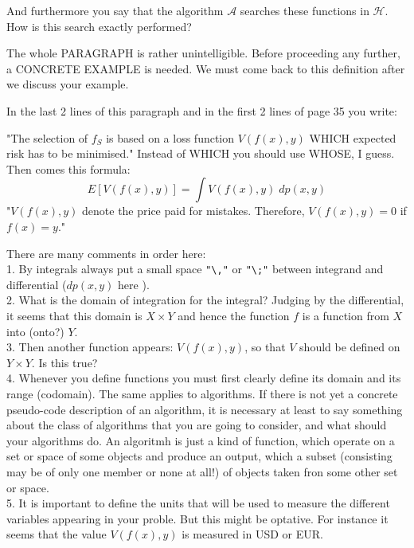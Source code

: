 \documentclass[12pt,reqno]{amsart}
\def\blue#1{{\color{blue} #1}}
\def\red#1{{\color{red} #1}}
\begin{document}
\begin{description}[style=unboxed,leftmargin=0cm,itemsep=3ex]
And furthermore you say that the algorithm $\mathcal{A}$ \red{searches}
these functions in $\mathcal{H}$.
How is this search exactly performed?

The whole PARAGRAPH is rather unintelligible.
Before proceeding any further, a CONCRETE EXAMPLE is needed. 
We must come back to this definition after we discuss your example.

In the last 2 lines of this paragraph and in the first 2 lines of page
35 you write:

"The selection of $f_S$ is based on a loss function $V(f(x),y)$
\red{WHICH} expected risk has to be minimised."
Instead of \red{WHICH} you should use \blue{WHOSE}, I guess.
Then comes this formula:
$$
E[V(f(x),y)] = \int V(f(x),y)\;dp(x,y)
$$
"$V(f(x),y)$ denote the price paid for mistakes. Therefore,
$V(f(x),y) = 0$ if $f(x) = y$."

There are many comments in order here:\\[1ex]

1. By integrals always put a small space \verb!"\,"! or \verb!"\;"!
between integrand and differential ($dp(x,y)$ here ).\\[1ex]

2. What is the domain of integration for the integral?
Judging by the differential, it seems that this domain is $X\times Y$
and hence the function $f$ is a function from $X$ into (onto?) $Y$.\\[1ex]

3. Then another function appears: $V(f(x),y)$, so that $V$ should be
defined on $Y\times Y$. Is this true? \\[1ex]

4. Whenever you define functions you must first clearly define its
domain and its range (codomain).
The same applies to algorithms.
If there is not yet a concrete pseudo-code description of an algorithm,
it is necessary at least to say something about the class of algorithms
that you are going to consider, and what should your algorithms do.
An algoritmh is just a kind of function, which operate on a set or
space of some objects and produce an output, which a subset (consisting
may be of only one member or none at all!) of objects taken fron some
other set or space. \\[1ex]

5. It is important to define the units that will be used to measure
the different variables appearing in your proble.
But this might be optative. For instance it seems that the value
$V(f(x),y)$ is measured in USD or EUR. \\[1ex]


\end{description}
\end{document}
